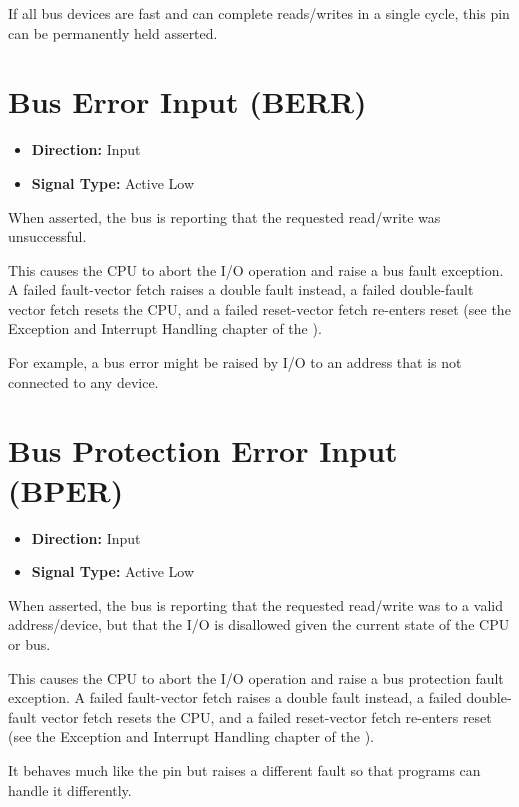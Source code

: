 If all bus devices are fast and can complete reads/writes in a single cycle, this pin can be permanently held asserted.

\section{Bus Error Input (BERR)}

\begin{itemize}
	\item \textbf{Direction:} Input
	\item \textbf{Signal Type:} Active Low
\end{itemize}

When asserted, the bus is reporting that the requested read/write was unsuccessful.

This causes the CPU to abort the I/O operation and raise a bus fault exception. A failed fault-vector fetch raises a
double fault instead, a failed double-fault vector fetch resets the CPU, and a failed reset-vector fetch re-enters
reset (see the Exception and Interrupt Handling chapter of the \archmanual{}).

For example, a bus error might be raised by I/O to an address that is not connected to any device.

\section{Bus Protection Error Input (BPER)}

\begin{itemize}
	\item \textbf{Direction:} Input
	\item \textbf{Signal Type:} Active Low
\end{itemize}

When asserted, the bus is reporting that the requested read/write was to a valid address/device, but that the I/O is
disallowed given the current state of the CPU or bus.

This causes the CPU to abort the I/O operation and raise a bus protection fault exception. A failed fault-vector fetch
raises a double fault instead, a failed double-fault vector fetch resets the CPU, and a failed reset-vector fetch
re-enters reset (see the Exception and Interrupt Handling chapter of the \archmanual{}).

It behaves much like the  pin but raises a different fault so that programs can handle it differently.

